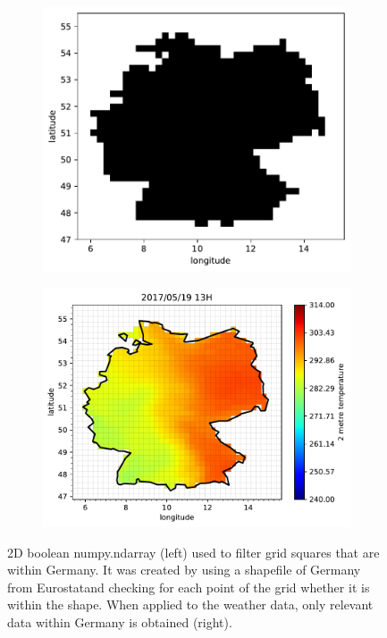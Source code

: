 \begin{figure}[h!]%
	\centering
	\begin{subfigure}{.5\textwidth}
		\centering
		\includegraphics[width=.85\textwidth]{plots/isinDE}%
		\label{fig:isinDE}%
	\end{subfigure}%
	\begin{subfigure}{.5\textwidth}
		\centering
		\includegraphics[width=.95\textwidth]{plots/t2m/maxvar/0_map_isin}%
		\label{fig:t2m_maxvar_0_map_isin}%
	\end{subfigure}
	\caption[2D boolean numpy.ndarray (left) used to filter grid squares that are within Germany. It was created by using a shapefile of Germany from Eurostat and checking for each point of the grid if it is within the shapefile. When applied to the weather data, only relevant data within Germany is obtained (right).]{2D boolean numpy.ndarray (left) used to filter grid squares that are within Germany. It was created by using a shapefile of Germany from Eurostat\footnotemark and checking for each point of the grid whether it is within the shape. When applied to the weather data, only relevant data within Germany is obtained (right).}
	\label{fig:isin_compare}
\end{figure}

